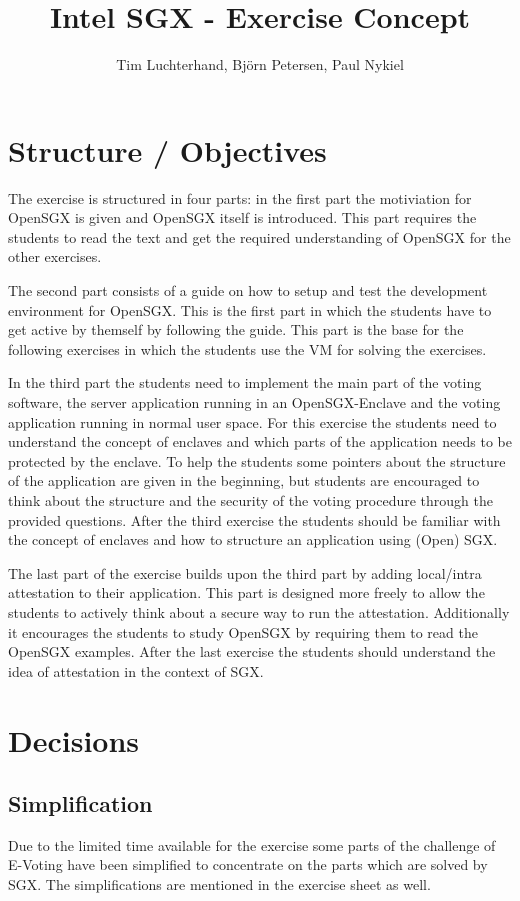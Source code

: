 \documentclass[DIN, pagenumber=false, fontsize=11pt, parskip=half]{scrartcl}
\title{Intel SGX - Exercise Concept}
\author{Tim Luchterhand, Björn Petersen, Paul Nykiel}
\begin{document}
    \maketitle
    \section{Structure / Objectives}
    The exercise is structured in four parts: in the first part the motiviation for OpenSGX is given and OpenSGX
    itself is introduced. This part requires the students to read the text and get the required understanding of
    OpenSGX for the other exercises.

    The second part consists of a guide on how to setup and test the development environment for OpenSGX. This is the
    first part in which the students have to get active by themself by following the guide. This part is the base
    for the following exercises in which the students use the VM for solving the exercises.

    In the third part the students need to implement the main part of the voting software, the server
    application running in an OpenSGX-Enclave and the voting application running in normal user space.
    For this exercise the students need to understand the concept of enclaves and which parts of the application
    needs to be protected by the enclave. To help the students some pointers about the structure of the application
    are given in the beginning, but students are encouraged to think about the structure and the security of the
    voting procedure through the provided questions. After the third exercise the students should be familiar with
    the concept of enclaves and how to structure an application using (Open) SGX.

    The last part of the exercise builds upon the third part by adding local/intra attestation to their application.
    This part is designed more freely to allow the students to actively think about a secure way to run the attestation.
    Additionally it encourages the students to study OpenSGX by requiring them to read the OpenSGX examples.
    After the last exercise the students should understand the idea of attestation in the context of SGX.
    
    \section{Decisions}
    \subsection{Simplification}
    Due to the limited time available for the exercise some parts of the challenge of
    E-Voting have been simplified to concentrate on the parts which are solved by SGX.
    The simplifications are mentioned in the exercise sheet as well.
\end{document}
